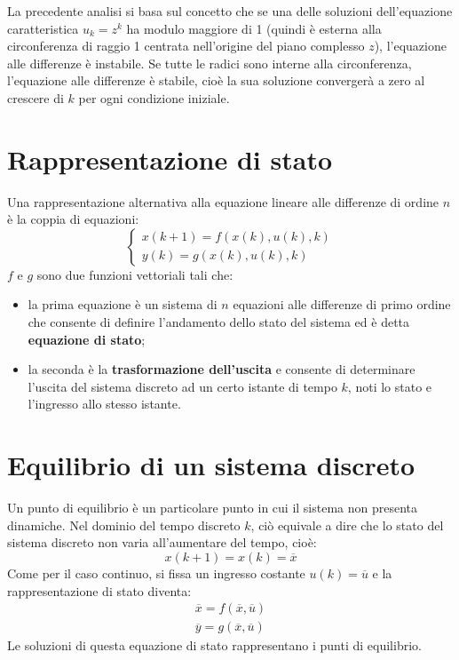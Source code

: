 \documentclass[a4paper]{report}
\newcommand{\bo}{\bfseries }
\begin{document}
La precedente analisi si basa sul concetto che se una delle soluzioni
dell'equazione caratteristica $u_k = z^k$ ha modulo maggiore di 1
(quindi \`e esterna alla circonferenza di raggio 1 centrata
nell'origine del piano complesso $z$), l'equazione alle differenze \`e
instabile. Se tutte le radici sono interne alla circonferenza,
l'equazione alle differenze \`e stabile, cio\`e la sua soluzione
converger\`a a zero al crescere di $k$ per ogni condizione iniziale.

\section{Rappresentazione di stato}
Una rappresentazione alternativa alla equazione lineare alle
differenze di ordine $n$ \`e la coppia di equazioni:
\[\left\{
\begin{array}{l}
  x(k + 1) = f(x(k), u(k), k)\\
  y(k) = g(x(k), u(k), k)
\end{array}
\right.
\]
$f$ e $g$ sono due funzioni vettoriali tali che:
\begin{itemize}
\item la prima equazione \`e un sistema di $n$ equazioni alle
  differenze di primo ordine che consente di definire l'andamento
  dello stato del sistema ed \`e detta {\bo equazione di stato};
\item la seconda \`e la {\bo trasformazione dell'uscita} e consente di
  determinare l'uscita del sistema discreto ad un certo istante di
  tempo $k$, noti lo stato e l'ingresso allo stesso istante.
\end{itemize}

\section{Equilibrio di un sistema discreto}
Un punto di equilibrio \`e un particolare punto in cui il sistema non
presenta dinamiche. Nel dominio del tempo discreto $k$, ci\`o equivale
a dire che lo stato del sistema discreto non varia all'aumentare del
tempo, cio\`e:
\[
x(k + 1) = x(k) = \overline{x}
\]
Come per il caso continuo, si fissa un ingresso costante $u(k) =
\overline{u}$ e la rappresentazione di stato diventa:
\[
\begin{array}{l}
  \overline{x} = f (\overline{x},\overline{u})\\
  \overline{y} = g (\overline{x}, \overline{u})
\end{array}
\]
Le soluzioni di questa equazione di stato rappresentano i punti di
equilibrio.
\end{document}
